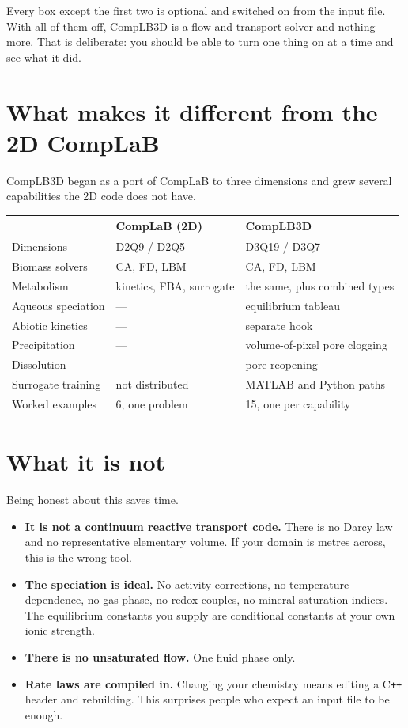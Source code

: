 Every box except the first two is optional and switched on from the input file.
With all of them off, CompLB3D is a flow-and-transport solver and nothing more.
That is deliberate: you should be able to turn one thing on at a time and see
what it did.

\section{What makes it different from the 2D CompLaB}

CompLB3D began as a port of CompLaB to three dimensions and grew several
capabilities the 2D code does not have.

\begin{center}
\begin{tabular}{@{}p{5.2cm}p{4.6cm}p{4.6cm}@{}}
\toprule
& \textbf{CompLaB (2D)} & \textbf{CompLB3D}\\
\midrule
Dimensions & D2Q9 / D2Q5 & D3Q19 / D3Q7\\
Biomass solvers & CA, FD, LBM & CA, FD, LBM\\
Metabolism & kinetics, FBA, surrogate & the same, plus combined types\\
Aqueous speciation & --- & equilibrium tableau\\
Abiotic kinetics & --- & separate hook\\
Precipitation & --- & volume-of-pixel pore clogging\\
Dissolution & --- & pore reopening\\
Surrogate training & not distributed & MATLAB and Python paths\\
Worked examples & 6, one problem & 15, one per capability\\
\bottomrule
\end{tabular}
\end{center}

\section{What it is not}

Being honest about this saves time.

\begin{itemize}[leftmargin=1.2em]
\item \textbf{It is not a continuum reactive transport code.} There is no
Darcy law and no representative elementary volume. If your domain is metres
across, this is the wrong tool.
\item \textbf{The speciation is ideal.} No activity corrections, no temperature
dependence, no gas phase, no redox couples, no mineral saturation indices. The
equilibrium constants you supply are conditional constants at your own ionic
strength.
\item \textbf{There is no unsaturated flow.} One fluid phase only.
\item \textbf{Rate laws are compiled in.} Changing your chemistry means editing
a C\texttt{++} header and rebuilding. This surprises people who expect an input
file to be enough.
\end{itemize}

